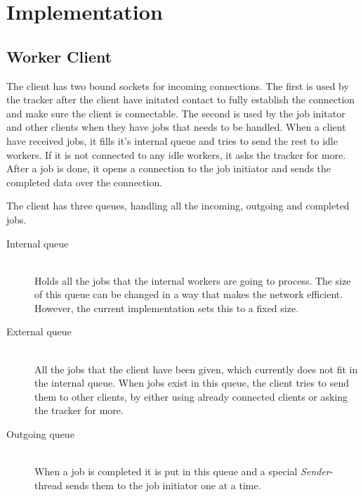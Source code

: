 \chapter{Implementation}


\section{Worker Client}
The client has two bound sockets for incoming connections. The first is used by the tracker after the client have initated contact to fully establish the connection and make sure the client is connectable.
The second is used by the job initator and other clients when they have jobs that needs to be handled.
When a client have received jobs, it fills it's internal queue and tries to send the rest to idle workers.
If it is not connected to any idle workers, it asks the tracker for more.
After a job is done, it opens a connection to the job initiator and sends the completed data over the connection.

The client has three queues, handling all the incoming, outgoing and completed jobs.
\begin{description}
	\item[Internal queue] \hfill \\
	Holds all the jobs that the internal workers are going to process. The size of this queue can be changed in a way that makes the network efficient. However, the current implementation sets this to a fixed size.
	\item[External queue] \hfill \\
	All the jobs that the client have been given, which currently does not fit in the internal queue.
	When jobs exist in this queue, the client tries to send them to other clients, by either using already connected clients or asking the tracker for more.
	\item[Outgoing queue] \hfill \\
	When a job is completed it is put in this queue and a special \textit{Sender}-thread sends them to the job initiator one at a time.
\end{description}

